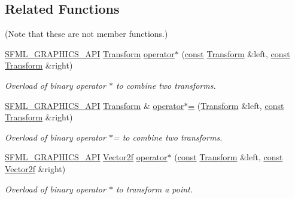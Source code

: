 \subsection*{Related Functions}
(Note that these are not member functions.) \begin{DoxyCompactItemize}
\item 
\hyperlink{sfml_2dep_2_s_f_m_l-2_84_82_2include_2_s_f_m_l_2_graphics_2_export_8hpp_ab84c9f1035e146917de3bc0f98d72b35}{S\-F\-M\-L\-\_\-\-G\-R\-A\-P\-H\-I\-C\-S\-\_\-\-A\-P\-I} \hyperlink{classsf_1_1_transform}{Transform} \hyperlink{classsf_1_1_transform_a423ade8d6aa1378c695f8eb4bfce8981}{operator$\ast$} (\hyperlink{term__entry_8h_a57bd63ce7f9a353488880e3de6692d5a}{const} \hyperlink{classsf_1_1_transform}{Transform} \&left, \hyperlink{term__entry_8h_a57bd63ce7f9a353488880e3de6692d5a}{const} \hyperlink{classsf_1_1_transform}{Transform} \&right)
\begin{DoxyCompactList}\small\item\em Overload of binary operator $\ast$ to combine two transforms. \end{DoxyCompactList}\item 
\hyperlink{sfml_2dep_2_s_f_m_l-2_84_82_2include_2_s_f_m_l_2_graphics_2_export_8hpp_ab84c9f1035e146917de3bc0f98d72b35}{S\-F\-M\-L\-\_\-\-G\-R\-A\-P\-H\-I\-C\-S\-\_\-\-A\-P\-I} \hyperlink{classsf_1_1_transform}{Transform} \& \hyperlink{classsf_1_1_transform_a45a9de70a463117f851f1264a6f558ba}{operator$\ast$=} (\hyperlink{classsf_1_1_transform}{Transform} \&left, \hyperlink{term__entry_8h_a57bd63ce7f9a353488880e3de6692d5a}{const} \hyperlink{classsf_1_1_transform}{Transform} \&right)
\begin{DoxyCompactList}\small\item\em Overload of binary operator $\ast$= to combine two transforms. \end{DoxyCompactList}\item 
\hyperlink{sfml_2dep_2_s_f_m_l-2_84_82_2include_2_s_f_m_l_2_graphics_2_export_8hpp_ab84c9f1035e146917de3bc0f98d72b35}{S\-F\-M\-L\-\_\-\-G\-R\-A\-P\-H\-I\-C\-S\-\_\-\-A\-P\-I} \hyperlink{namespacesf_a80cea3c46537294fd1d8d428566ad8b2}{Vector2f} \hyperlink{classsf_1_1_transform_ac729169ec3036f3f3f3024c98efd041d}{operator$\ast$} (\hyperlink{term__entry_8h_a57bd63ce7f9a353488880e3de6692d5a}{const} \hyperlink{classsf_1_1_transform}{Transform} \&left, \hyperlink{term__entry_8h_a57bd63ce7f9a353488880e3de6692d5a}{const} \hyperlink{namespacesf_a80cea3c46537294fd1d8d428566ad8b2}{Vector2f} \&right)
\begin{DoxyCompactList}\small\item\em Overload of binary operator $\ast$ to transform a point. \end{DoxyCompactList}\item 

\end{DoxyCompactItemize}
